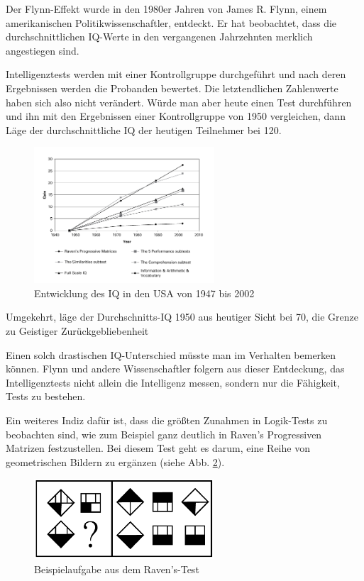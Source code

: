Der Flynn-Effekt wurde in den 1980er Jahren von James R. Flynn, einem amerikanischen Politikwissenschaftler, entdeckt. Er hat beobachtet, dass die durchschnittlichen IQ-Werte in den vergangenen Jahrzehnten merklich angestiegen sind.

Intelligenztests werden mit einer Kontrollgruppe durchgeführt und nach deren Ergebnissen werden die Probanden bewertet. Die letztendlichen Zahlenwerte haben sich also nicht verändert. Würde man aber heute einen Test durchführen und ihn mit den Ergebnissen einer Kontrollgruppe von 1950 vergleichen, dann Läge der durchschnittliche IQ der heutigen Teilnehmer bei 120.

\begin{figure}[H]
  \centering
  \includegraphics[width=0.6\textwidth]{img/Flynn.png}
  \caption{Entwicklung des IQ in den USA von 1947 bis 2002 \cite{flynn}}
  \label{fig:flynn}
\end{figure}

Umgekehrt, läge der Durchschnitts-IQ 1950 aus heutiger Sicht bei 70, die Grenze zu \glqq Geistiger Zurückgebliebenheit\grqq{}
\cite{ted_flynn}

Einen solch drastischen IQ-Unterschied müsste man im Verhalten bemerken können. Flynn und andere Wissenschaftler folgern aus dieser Entdeckung, das Intelligenztests nicht allein die Intelligenz messen, sondern nur die Fähigkeit, Tests zu bestehen.

Ein weiteres Indiz dafür ist, dass die größten Zunahmen in Logik-Tests zu beobachten sind, wie zum Beispiel ganz deutlich in \glqq Raven's Progressiven Matrizen \grqq{} festzustellen. Bei diesem Test geht es darum, eine Reihe von geometrischen Bildern zu ergänzen (siehe Abb. \ref{fig:ravens}).

\begin{figure}[H]
  \centering
  \includegraphics[width=0.6\textwidth]{img/ravens.png}
  \caption{Beispielaufgabe aus dem Raven's-Test \cite{flynn}}
  \label{fig:ravens}
\end{figure}

